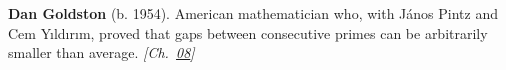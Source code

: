 \textbf{Dan Goldston} (b. 1954). American mathematician who, with J\'{a}nos Pintz and Cem Y{\i}ld{\i}r{\i}m, proved that gaps between consecutive primes can be arbitrarily smaller than average. \emph{[Ch.~\hyperref[ch:boundedprimegaps]{08}]}


